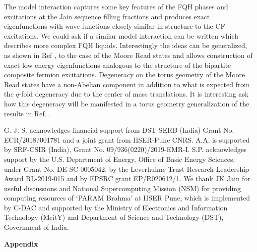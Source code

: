 \documentclass[prb,aps,epsfig,longbibliography,twocolumn]{revtex4-1}
\begin{document}
The model interaction captures some key features of the FQH phases and excitations at the Jain sequence filling fractions and produces exact eigenfunctions with wave functions closely similar in structure to the CF excitations.
We could ask if a similar model interaction can be written which describes more complex FQH liquids. Interestingly the ideas can be generalized, as shown in Ref , to the case of the Moore Read states and allows construction of exact low energy eigenfunctions analogous to the structure of the bipartite composite fermion excitations.\cite{Sreejith11,PhysRevLett.107.086806,Sreejith13} Degeneracy on the torus geometry of the Moore Read states have a non-Abelian component in addition to what is expected from the $q$-fold degeneracy due to the center of mass translations. It is interesting ask how this degeneracy will be manifested in a torus geometry generalization of the results in Ref. . 

\begin{acknowledgments}
G. J. S. acknowledges financial support from DST-SERB (India) Grant No. ECR/2018/001781 and a joint grant from IISER-Pune CNRS. A.A. is supported by SRF-CSIR
(India), Grant No. 09/936(0220)/2019-EMR-I. S.P. acknowledges support by the U.S. Department of Energy, Office of Basic Energy Sciences, under Grant No. DE-SC-0005042, by the Leverhulme Trust Research Leadership Award RL-2019-015 and by EPSRC grant EP/R020612/1.
%
We thank JK Jain for useful discussions and National Supercomputing Mission
(NSM) for providing computing resources of `PARAM Brahma' at IISER Pune, which is implemented by C-DAC and supported by the Ministry of Electronics and Information Technology (MeitY) and Department of Science and Technology (DST), Government of India.
\end{acknowledgments}






\widetext

\begin{center}
	\textbf{\large Appendix}
\end{center}

\setcounter{equation}{0}
\setcounter{table}{0}
\setcounter{page}{1}
\setcounter{section}{0}
\makeatletter
\renewcommand{\thesection}{\Alph{section}}
\renewcommand{\theequation}{A\arabic{equation}}
\renewcommand{\thefigure}{\arabic{figure}}
\renewcommand{\bibnumfmt}[1]{[A#1]}
\renewcommand{\citenumfont}[1]{A#1}
\end{document}
